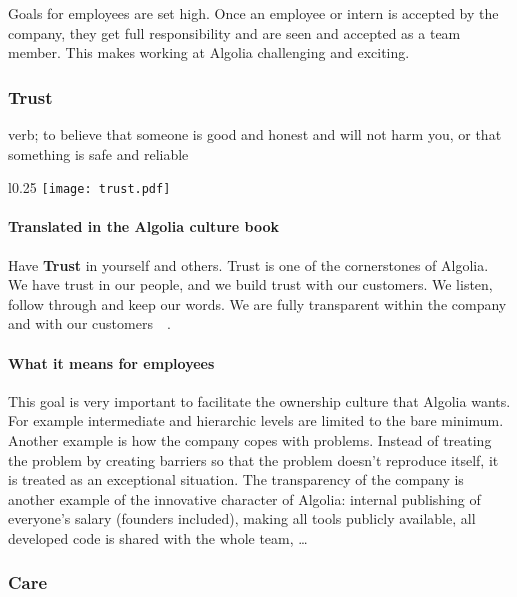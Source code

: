 Goals for employees are set high. Once an employee or intern is accepted by the company, they get full responsibility and are seen and accepted as a team member. This makes working at Algolia challenging and exciting.

\subsubsection{Trust}
\label{ssub:trust}

\begin{definition}
verb; to believe that someone is good and honest and will not harm you, or that something is safe and reliable\cite{cambridge-trust}
\end{definition}

\begin{wrapfigure}{l}{0.25\textwidth}
  \centering
  \texttt{[image: trust.pdf]}
\end{wrapfigure}

\paragraph{Translated in the Algolia culture book}

Have \textbf{Trust} in yourself and others. Trust is one of the cornerstones of Algolia. We have trust in our people, and we build trust with our customers. We listen, follow through and keep our words. We are fully transparent within the company and with our customers~\cite{algolia-careers}~.

\paragraph{What it means for employees}

This goal is very important to facilitate the ownership culture that Algolia wants. For example intermediate and hierarchic levels are limited to the bare minimum. Another example is how the company copes with problems. Instead of treating the problem by creating barriers so that the problem doesn't reproduce itself, it is treated as an exceptional situation. The transparency of the company is another example of the innovative character of Algolia: internal publishing of everyone's salary (founders included), making all tools publicly available, all developed code is shared with the whole team, \dots

\subsubsection{Care}
\label{ssub:care}

